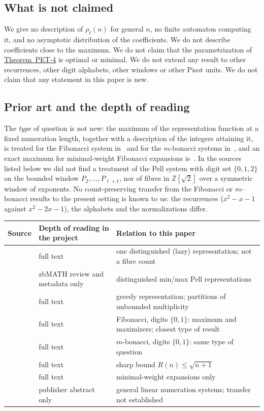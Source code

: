 \documentclass[11pt]{amsart}
\theoremstyle{definition}
\theoremstyle{remark}
\theoremstyle{plain}
\numberwithin{equation}{section}
\newcommand{\Z}{\mathbb{Z}}
\newcommand{\PETfour}{\hyperref[thm:pet4]{Theorem~PET-4}}
\begin{document}
\subsection{What is not claimed}
We give no description of $\rho_\ell(n)$ for general $n$, no finite automaton computing it, and no
asymptotic distribution of the coefficients. We do not describe coefficients close to the maximum.
We do not claim that the parametrization of \PETfour{} is optimal or minimal. We do not extend any
result to other recurrences, other digit alphabets, other windows or other Pisot units. We do not
claim that any statement in this paper is new.

\subsection{Prior art and the depth of reading}\label{sec:prior}
The \emph{type} of question is not new: the maximum of the representation function at a fixed
numeration length, together with a description of the integers attaining it, is treated for the
Fibonacci system in~\cite{KMP2005} and for the $m$-bonacci systems in~\cite{KMP2007}, and an exact
maximum for minimal-weight Fibonacci expansions is~\cite[Theorem~4.6]{GrabnerSteiner2011}. In the
sources listed below we did not find a treatment of the Pell system with digit set $\{0,1,2\}$ on the
bounded window $P_2,\dots,P_{\ell+1}$, nor of fibres in $\Z[\sqrt2]$ over a symmetric window of
exponents. No count-preserving transfer from the Fibonacci or $m$-bonacci results to the present
setting is known to us: the recurrences ($x^2-x-1$ against $x^2-2x-1$), the alphabets and the
normalizations differ.

\begin{center}
\small
\begin{tabularx}{\textwidth}{@{}l>{\raggedright\arraybackslash}X>{\raggedright\arraybackslash}X@{}}
\toprule
Source & Depth of reading in the project & Relation to this paper\\
\midrule
\cite{Horadam1994} & full text & one distinguished (lazy) representation; not a fibre count\\
\cite{Horadam1996} & zbMATH review and metadata only & distinguished min/max Pell representations\\
\cite{KnopfmacherRobbins2004} & full text & greedy representation; partitions of unbounded multiplicity\\
\cite{KMP2005} & full text & Fibonacci, digits $\{0,1\}$: maximum and maximizers; closest type of result\\
\cite{KMP2007} & full text & $m$-bonacci, digits $\{0,1\}$: same type of question\\
\cite{Stockmeyer2009} & full text & sharp bound $R(n)\le\sqrt{n+1}$\\
\cite{GrabnerSteiner2011} & full text & minimal-weight expansions only\\
\cite{Edson2013} & publisher abstract only & general linear numeration systems; transfer not established\\
\bottomrule
\end{tabularx}
\end{center}
\end{document}

